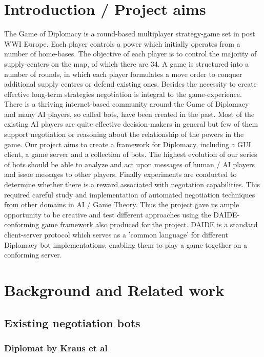 \documentclass[11pt]{article} \usepackage{fullpage} \usepackage{cite}
\begin{document}
\section{Introduction / Project aims}
The Game of Diplomacy is a round-based multiplayer strategy-game set in post WWI
Europe. Each player controls a power which initially operates from a number of
home-bases. The objective of each player is to control the majority of
supply-centers on the map, of which there are 34. A game is structured into a
number of rounds, in which each player formulates a move order to conquer
additional supply centres or defend existing ones. Besides the necessity to
create effective long-term strategies negotiation is integral to the
game-experience.  There is a thriving internet-based community around the Game
of Diplomacy and many AI players, so called bots, have been created in the
past. Most of the existing AI players are quite effective decision-makers in
general but few of them support negotiation or reasoning about the relationship
of the powers in the game. Our project aims to create a framework for Diplomacy,
including a GUI client, a game server and a collection of bots. The highest
evolution of our series of bots should be able to analyze and act upon messages
of human / AI players and issue messages to other players. Finally experiments
are conducted to determine whether there is a reward associated with negotation
capabilities. This required careful study and implementation of automated
negotiation techniques from other domains in AI / Game Theory. Thus the project
gave us ample opportunity to be creative and test different approaches using the
DAIDE-conforming game framework also produced for the project. DAIDE is a
standard client-server protocol \cite{daidewebsite} which serves as a 'common
language' for different Diplomacy bot implementations, enabling them to play a
game together on a conforming server.

\section{Background and Related work}

\subsection{Existing negotiation bots}

\subsubsection{Diplomat by Kraus et al}
\end{document}
